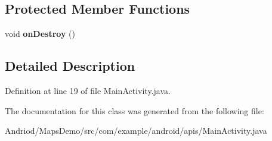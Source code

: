 \subsection*{Protected Member Functions}
\begin{DoxyCompactItemize}
\item 
\hypertarget{classcom_1_1example_1_1android_1_1apis_1_1_main_activity_a8a744b43949a3939f448facad211e3d2}{void {\bfseries on\-Destroy} ()}\label{classcom_1_1example_1_1android_1_1apis_1_1_main_activity_a8a744b43949a3939f448facad211e3d2}

\end{DoxyCompactItemize}


\subsection{Detailed Description}


Definition at line 19 of file Main\-Activity.\-java.



The documentation for this class was generated from the following file\-:\begin{DoxyCompactItemize}
\item 
Andriod/\-Maps\-Demo/src/com/example/android/apis/Main\-Activity.\-java\end{DoxyCompactItemize}
